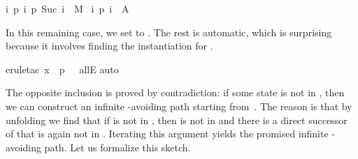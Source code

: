 \begin{isabellebody}
\begin{isamarkuptxt}
\begin{isabelle}
i{\isachardot}\ {\isacharparenleft}p\ i{\isacharcomma}\ p\ {\isacharparenleft}Suc\ i{\isacharparenright}{\isacharparenright}\ {\isasymin}\ M{\isasymrbrakk}\isanewline
{}\ {\isasymexists}i{\isachardot}\ p\ i\ {\isasymin}\ A%
\end{isabelle}
In this remaining case, we set  to .
The rest is automatic, which is surprising because it involves
finding the instantiation 
for .%
\end{isamarkuptxt}%
\isamarkuptrue%
\isamarkupfalse%
{\isacharparenleft}erule{\isacharunderscore}tac\ x\ {\isacharequal}\ {\isachardoublequoteopen}p\ {}{\isachardoublequoteclose}\ \ allE{\isacharparenright}\isanewline
{}\isamarkupfalse%
{\isacharparenleft}auto{\isacharparenright}\isanewline
{}\isamarkupfalse%
%
\endisatagproof
{\isafoldproof}%
%
\isadelimproof
%
\endisadelimproof
%
\begin{isamarkuptext}%
The opposite inclusion is proved by contradiction: if some state
 is not in , then we can construct an
infinite -avoiding path starting from~. The reason is
that by unfolding  we find that if  is not in
, then  is not in  and there is a
direct successor of  that is again not in \mbox{}. Iterating this argument yields the promised infinite
-avoiding path. Let us formalize this sketch.


\end{isamarkuptext}
\end{isabellebody}
